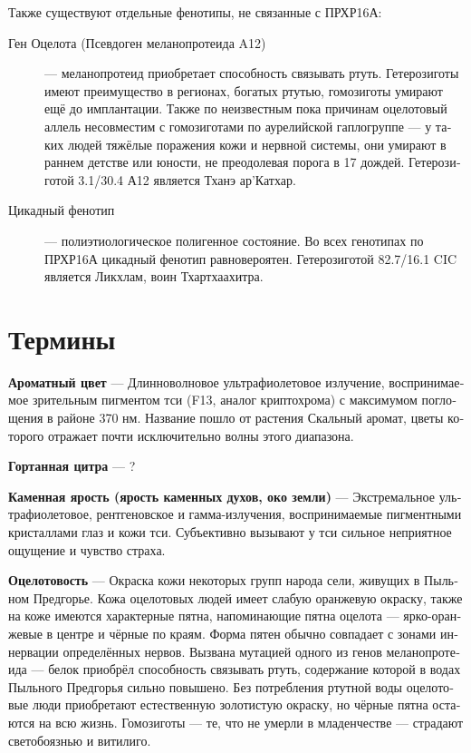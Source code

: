 \documentclass[a4paper,12pt,fleqn]{book}\usepackage{cooltooltips}\usepackage{polyglossia}\setdefaultlanguage[babelshorthands=true]{russian}\setotherlanguage{english}\defaultfontfeatures{Ligatures=TeX,Mapping=tex-text} \usepackage{xcolor}\definecolor{lightgray}{HTML}{bbbbbb}\color{lightgray}\newcommand{\ml}[3]{\textenglish{\textcolor{black}{#3}}}
\newcommand{\theterm}[3]{\textbf{\hypertarget{#1}{#2}} --- #3}
\begin{document}
Также существуют отдельные фенотипы, не связанные с ПРХР16А:

\begin{description}
\item[Ген Оцелота (Псевдоген меланопротеида A12)] --- меланопротеид приобретает способность связывать ртуть.
Гетерозиготы имеют преимущество в регионах, богатых ртутью, гомозиготы умирают ещё до имплантации.
Также по неизвестным пока причинам оцелотовый аллель несовместим с гомозиготами по аурелийской гаплогруппе --- у таких людей тяжёлые поражения кожи и нервной системы, они умирают в раннем детстве или юности, не преодолевая порога в 17 дождей.
Гетерозиготой 3.1/30.4 А12 является Тханэ ар'Катхар.
\item[Цикадный фенотип] --- полиэтиологическое полигенное состояние.
Во всех генотипах по ПРХР16А цикадный фенотип равновероятен.
Гетерозиготой 82.7/16.1 CIC является Ликхлам, воин Тхартхаахитра.
\end{description}


\section{Термины}

\theterm{flavor-color}
{Ароматный цвет}
{Длинноволновое ультрафиолетовое излучение, воспринимаемое зрительным пигментом тси (F13, аналог криптохрома) с максимумом поглощения в районе 370 нм.
Название пошло от растения Скальный аромат, цветы которого отражает почти исключительно волны этого диапазона.}

\theterm{throat-cither}
{Гортанная цитра}
{?}

\theterm{stone-fury}
{Каменная ярость (ярость каменных духов, око земли)}
{Экстремальное ультрафиолетовое, рентгеновское и гамма-излучения, воспринимаемые пигментными кристаллами глаз и кожи тси.
Субъективно вызывают у тси сильное неприятное ощущение и чувство страха.}

\theterm{ocelocity}
{Оцелотовость}
{Окраска кожи некоторых групп народа сели, живущих в Пыльном Предгорье.
Кожа оцелотовых людей имеет слабую оранжевую окраску, также на коже имеются характерные пятна, напоминающие пятна оцелота --- ярко-оранжевые в центре и чёрные по краям.
Форма пятен обычно совпадает с зонами иннервации определённых нервов.
Вызвана мутацией одного из генов меланопротеида --- белок приобрёл способность связывать ртуть, содержание которой в водах Пыльного Предгорья сильно повышено.
Без потребления ртутной воды оцелотовые люди приобретают естественную золотистую окраску, но чёрные пятна остаются на всю жизнь.
Гомозиготы --- те, что не умерли в младенчестве --- страдают светобоязнью и витилиго.}
\end{document}
